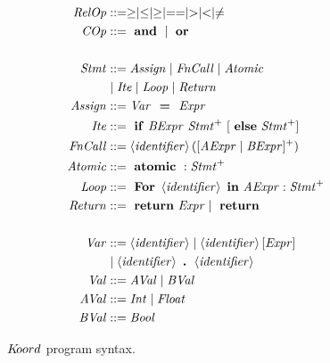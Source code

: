 \begin{figure}[H]
\begin{align*}
\begin{split}
\mathit{RelOp} &::=  \geq \mid \leq \mid \geq \mid == \mid > \mid < \mid \neq\\ 
\mathit{COp} &::=  \mterm{and} \mid \mterm{or} \\\\ 
\stmt &::= \asgn \mid \fncall\mid\atmc  \\ 
      & \mid\cndnl\mid \floop \mid \ret \\
\asgn &::= \var\ \mterm{=}\  \expr \\
\cndnl &::= \mterm{if} \bexpr\ \stmts \ [\mterm{else} \stmts]\\
\fncall &::= \id ([\aexpr\mid\bexpr]^+) \\
\atmc &::= \mterm{atomic}: \stmts\\
\floop &::= \mterm{For} \id \mterm{in} \aexpr : \stmts\\
\ret &::= \mterm{return} \expr \mid \mterm{return} \\\\
\var &::= \id \mid \id [\expr] \\ &\mid \id \mterm{.} \id \\
\val &::= \aval \mid \bval \\
\aval &::= \mathit{Int} \mid \mathit{Float}  \\
\bval &::= \mathit{Bool} 
\end{split}
\end{align*}
\caption{$\lgname$ program syntax.}
\label{fig:syntax}
\end{figure}




